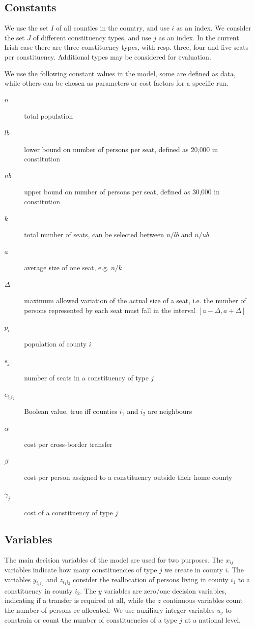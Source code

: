 \documentclass[runningheads]{llncs}
\begin{document}
\subsection{Constants}

We use the set $I$ of all counties in the country, and use $i$ as an index. We consider the set $J$ of different constituency types, and use $j$ as an index. In the current Irish case there are three constituency types, with resp. three, four and five seats per constituency. Additional types may be considered for evaluation.

We use the following constant values in the model, some are defined as data, while others can be chosen as parameters or cost factors for a specific run. 

\begin{description}
\item[$n$] total population
\item[$lb$] lower bound on number of persons per seat, defined as 20,000 in constitution
\item[$ub$] upper bound on number of persons per seat, defined as 30,000 in constitution
\item[$k$] total number of seats, can be selected between $n/lb$ and $n/ub$ 
\item[$a$] average size of one seat, e.g. $n/k$
\item[$\Delta$] maximum allowed variation of the actual size of a seat, i.e. the number of persons represented by each seat must fall in the interval $[a-\Delta,a+\Delta]$ 
\item[$p_{i}$] population of county $i$
\item[$s_{j}$] number of seats in a constituency of type $j$
\item[$c_{i_1i_2}$] Boolean value, true iff counties $i_1$ and $i_2$ are neighbours 
\item[$\alpha$] cost per cross-border transfer
\item[$\beta$] cost per person assigned to a constituency outside their home county
\item[$\gamma_{j}$] cost of a constituency of type $j$
\end{description}

\subsection{Variables}

The main decision variables of the model are used for two purposes. The $x_{ij}$ variables indicate how many constituencies of type $j$ we create in county $i$. The variables $y_{i_1i_2}$ and $z_{i_1i_2}$ consider the reallocation of persons living in county $i_1$ to a constituency in county $i_2$. The $y$ variables are zero/one decision variables, indicating if a transfer is required at all, while the $z$ continuous variables count the number of persons re-allocated. We use auxiliary integer variables $u_{j}$ to constrain or count the number of constituencies of a type $j$ at a national level. 
\end{document}

